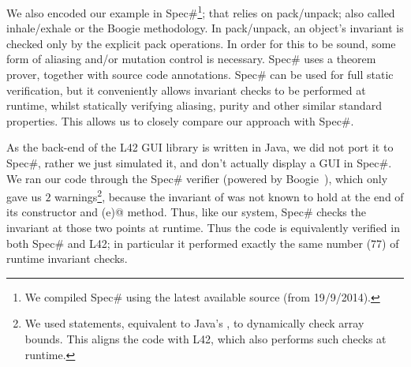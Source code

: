 

We also encoded our example in Spec\#\footnote{We compiled Spec\# using the latest available source (from 19/9/2014).}; that relies on pack/unpack; also called inhale/exhale or the Boogie methodology.
In pack/unpack, an object's invariant is checked only by the explicit pack operations.
In order for this to be sound, some form of aliasing and/or mutation control is necessary. Spec\# uses a theorem prover, together with source code annotations.
Spec\# can be used for full static verification, but it conveniently allows invariant checks to be performed at runtime, whilst statically verifying aliasing, purity and other similar standard properties.
This allows us to closely compare our approach with Spec\#.

As the back-end of the L42 GUI library is written in Java, we did not port it to Spec\#, rather we just simulated it, and don't actually display a GUI in Spec\#.
We ran our code through the Spec\# verifier (powered by Boogie~\cite{DBLP:conf/fmco/BarnettCDJL05}), which only gave us $2$ warnings\footnote{We used \Q@assume@ statements, equivalent to Java's \Q@assert@, to dynamically check array bounds. %
This aligns the code with L42, which also performs such checks at runtime.}, because the invariant of \Q@SafeMovable@ was not known to hold at the end of its constructor and \Q@dispatch(e)@ method. Thus, like our system, Spec\# checks the invariant
at those two points at runtime. Thus the code is equivalently verified in both Spec\# and L42; in particular it performed exactly the same number ($77$) of runtime invariant checks.


